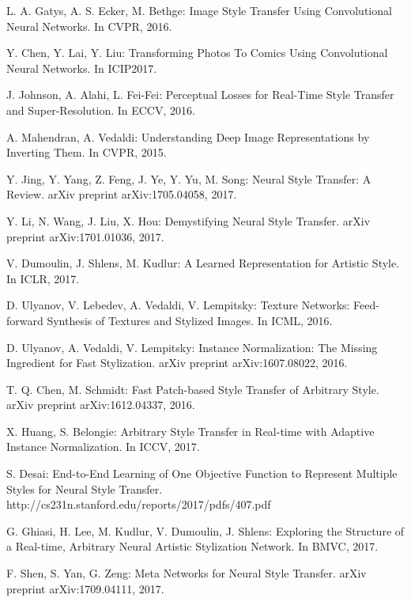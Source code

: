 \documentclass{llncs}
\begin{document}
%
%
\begin{thebibliography}{5}
%
L. A. Gatys, A. S. Ecker, M. Bethge:
Image Style Transfer Using Convolutional Neural Networks.
In CVPR, 2016.

Y. Chen, Y. Lai, Y. Liu:
Transforming Photos To Comics Using Convolutional Neural Networks.
In ICIP2017.

J. Johnson, A. Alahi, L. Fei-Fei:
Perceptual Losses for Real-Time Style Transfer and Super-Resolution.
In ECCV, 2016.

A. Mahendran, A. Vedaldi:
Understanding Deep Image Representations by Inverting Them.
In CVPR, 2015.

Y. Jing, Y. Yang, Z. Feng, J. Ye, Y. Yu, M. Song:
Neural Style Transfer: A Review.
arXiv preprint arXiv:1705.04058, 2017.

Y. Li, N. Wang, J. Liu, X. Hou:
Demystifying Neural Style Transfer.
arXiv preprint arXiv:1701.01036, 2017.

V. Dumoulin, J. Shlens, M. Kudlur:
A Learned Representation for Artistic Style.
In ICLR, 2017.

D. Ulyanov, V. Lebedev, A. Vedaldi, V. Lempitsky:
Texture Networks: Feed-forward Synthesis of Textures and Stylized Images.
In ICML, 2016.

D. Ulyanov, A. Vedaldi, V. Lempitsky:
Instance Normalization: The Missing Ingredient for Fast
Stylization.
arXiv preprint arXiv:1607.08022, 2016.

T. Q. Chen, M. Schmidt:
Fast Patch-based Style Transfer of Arbitrary Style.
arXiv preprint arXiv:1612.04337, 2016.

X. Huang, S. Belongie:
Arbitrary Style Transfer in Real-time with Adaptive Instance Normalization.
In ICCV, 2017.

S. Desai:
End-to-End Learning of One Objective Function to Represent Multiple Styles for Neural Style Transfer.
http://cs231n.stanford.edu/reports/2017/pdfs/407.pdf

G. Ghiasi, H. Lee, M. Kudlur, V. Dumoulin, J. Shlens:
Exploring the Structure of a Real-time, Arbitrary Neural Artistic Stylization Network.
In BMVC, 2017.

F. Shen, S. Yan, G. Zeng:
Meta Networks for Neural Style Transfer.
arXiv preprint arXiv:1709.04111, 2017.


\end{thebibliography}
\end{document}
